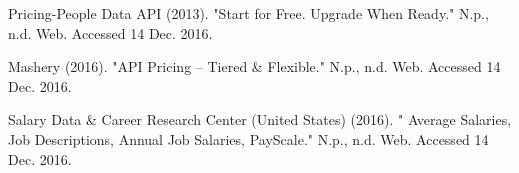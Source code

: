 \documentclass{roffin}
\begin{document}
\vfill

\begin{thebibliography}{}

Pricing-People Data API (2013).
"Start for Free. Upgrade When Ready."
N.p., n.d. Web. Accessed 14 Dec. 2016.

Mashery (2016).
"API Pricing – Tiered \& Flexible."
N.p., n.d. Web. Accessed 14 Dec. 2016.

Salary Data & Career Research Center (United States) (2016).
" Average Salaries, Job Descriptions, Annual Job Salaries, PayScale."
N.p., n.d. Web. Accessed 14 Dec. 2016.

\end{thebibliography}
\end{document}
